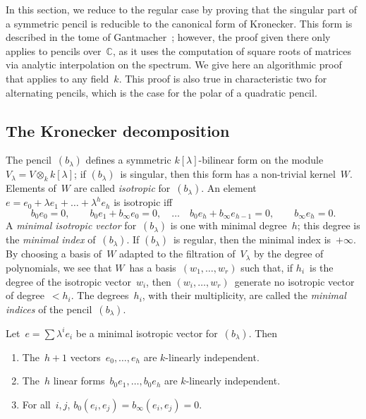\documentclass{article}%
\begin{document}
In this section, we reduce to the regular case by proving that
the singular part of a symmetric pencil is reducible to
the canonical form of Kronecker.
This form is described in the tome of Gantmacher~\cite[XII(56)]{Gantmacher};
however, the proof given there only applies to pencils over~$ℂ$,
as it uses the computation of square roots of matrices
via analytic interpolation on the spectrum.
We give here an algorithmic proof that applies to any field~$k$.
This proof is also true in characteristic two for alternating pencils,
which is the case for the polar of a quadratic pencil.

\subsection{The Kronecker decomposition} %
\label{SS:Kronecker-reduction}
The pencil~$(b_{λ})$ defines a symmetric $k[λ]$-bilinear form on the
module~$V_{λ} = V ⊗_{k} k[λ]$; if $(b_{λ})$~is singular, then this form
has a non-trivial kernel~$W$. Elements of~$W$ are called \emph{isotropic}
for~$(b_{λ})$. An element~$e = e_0 + λ e_1 + … + λ^h e_h$ is isotropic iff
\begin{equation}\label{eq:isotropic}
b_0 e_0 = 0, \qquad
b_0 e_1 + b_{∞} e_0 = 0, \quad … \quad
b_0 e_h + b_{∞} e_{h-1} = 0, \qquad
b_{∞} e_{h} = 0.
\end{equation}
A \emph{minimal isotropic vector} for~$(b_{λ})$ is one with minimal
degree~$h$; this degree is the \emph{minimal index} of~$(b_{λ})$. If
$(b_{λ})$~is regular, then the minimal index is~$+∞$.
By choosing a basis of~$W$ adapted to
the filtration of~$V_{λ}$ by the degree of polynomials,
we see that $W$~has a basis~$(w_1, …,w_r)$ such that,
if $h_i$~is the degree of the isotropic vector~$w_i$,
then $(w_i, …,w_r)$~generate no isotropic vector of degree~$< h_i$.
The degrees~$h_i$, with their multiplicity,
are called the \emph{minimal indices} of the pencil~$(b_{λ})$.
\begin{prop}\label{prop:minimal-indep}%
Let~$e = ∑ λ^i e_i$ be a minimal isotropic vector for~$(b_{λ})$. Then
\begin{enumerate}
\item The~$h+1$ vectors~$e_0, …, e_h$ are $k$-linearly independent.
\item The~$h$ linear forms~$b_{0} e_1, …, b_{0} e_h$ are $k$-linearly
independent.
\item For all~$i, j$, $b_{0}(e_i, e_j) = b_{∞}(e_i, e_j) = 0$.
\end{enumerate}
\end{prop}
\end{document}
